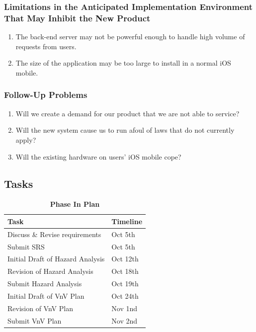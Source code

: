 \documentclass[12pt]{article}
\begin{document}
\subsubsection{Limitations in the Anticipated Implementation Environment That May Inhibit the New Product}
\begin{enumerate}
    \item The back-end server may not be powerful enough to handle high volume of requests from users.
    \item The size of the application may be too large to install in a normal iOS mobile.
\end{enumerate}

\subsubsection{Follow-Up Problems}
\begin{enumerate}
    \item Will we create a demand for our product that we are not able to service?
    \item Will the new system cause us to run afoul of laws that do not currently apply?
    \item Will the existing hardware on users' iOS mobile cope?
\end{enumerate}
\newpage
\subsection{Tasks}
\begin{flushleft}
\begin{table}[bp hp]
\caption{\bf Phase In Plan}
    \begin{tabularx}{\linewidth}{|l|X|}
        \toprule {\bf Task} & {\bf Timeline}\\
        \midrule
        Discuss \& Revise requirements  & Oct 5th\\
        \hline
        Submit SRS & Oct 5th\\
        \hline
        Initial Draft of Hazard Analysis & Oct 12th\\
        \hline
        Revision of Hazard Analysis & Oct 18th\\
        \hline
        Submit Hazard Analysis & Oct 19th\\
        \hline
        Initial Draft of VnV Plan & Oct 24th\\
        \hline
        Revision of VnV Plan & Nov 1nd\\
        \hline
        Submit VnV Plan & Nov 2nd\\
        \bottomrule
    \end{tabularx}
\end{table}
\end{flushleft}
\end{document}
